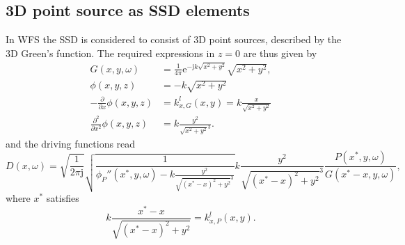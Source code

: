 \documentclass[12pt,a4paper]{article}
\newcommand{\te}{\mathrm{e}}
\newcommand{\ti}{\mathrm{j}}
\begin{document}
\subsection{3D point source as SSD elements}
In WFS the SSD is considered to consist of 3D point sources, described by the 3D Green's function. The required expressions in $z=0$ are thus given by
\begin{align}
G(x,y,\omega)  &= \frac{1}{4\pi}\te^{-\ti k \sqrt{x^2+y^2}}{\sqrt{x^2 + y^2}},\\
\phi(x,y,z)    &= -k \sqrt{x^2+y^2} \\
-\frac{\partial}{\partial x} \phi(x,y,z)     &= k_{x,G}^l(x,y) = k \frac{x}{\sqrt{x^2+y^2}}\\
\frac{\partial^2}{\partial x^2} \phi(x,y,z) &= k\frac{y^2}{\sqrt{x^2+y^2}^3} .
\end{align}
and the driving functions read
\begin{equation}
D(x,\omega) = 
\sqrt{\frac{1}{2\pi \ti}}
\sqrt{\frac{1}{\phi_P''(x^*,y,\omega) - k\frac{y^2}{\sqrt{(x^*-x)^2+y^2}^3}}}
k\frac{y^2}{\sqrt{(x^*-x)^2+y^2}^3}
\frac{ P(x^*,y,\omega) }{G(x^*- x,y,\omega) },
\end{equation}
where $x^*$ satisfies
\begin{equation}
 k \frac{x^*-x}{\sqrt{(x^*-x)^2+y^2}} = k_{x,P}^l(x,y).
\end{equation}
\end{document}
